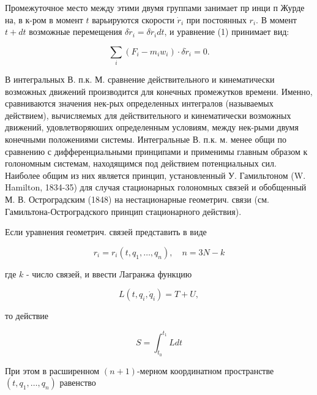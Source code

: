 \documentclass[10pt]{article}
\begin{document}
Промежуточное место между этими двумя группами занимает пр инци п Журде на, в к-ром в момент $t$ варьируются скорости $\dot{r}_{i}$ при постоянных $r_{i}$. В момент $t+d t$ возможные перемещения $\delta \dot{r}_{i}=\delta \ddot{r}_{i} d t$, и уравнение (1) принимает вид:



\[

\sum_{i}\left(F_{i}-m_{i} w_{i}\right) \cdot \delta \dot{r}_{i}=0 .

\]



В интегральных В. п.к. М. сравнение действительного и кинематически возможных движений производится для конечных промежутков времени. Именно, сравниваются значения нек-рых определенных интегралов (называемых действием), вычисляемых для действительного и кинематически возможных движений, удовлетворяюших определенным условиям, между нек-рыми двумя конечными положениями системы. Интегральные В. п.к. м. менее общи по сравнению с дифференциальными принципами и применимы главным образом к голономным системам, находящимся под действием потенциальных сил. Наиболее общим из них является принцип, установленный У. Гамильтоном (W. Hamilton, 1834-35) для случая стационарных голономных связей и обобщенный М. В. Остроградским (1848) на нестационарные геометрич. связи (см. Гамильтона-Остроградского принцип стационарного действия).



Если уравнения геометрич. связей представить в виде



\[

r_{i}=r_{i}\left(t, q_{1}, \ldots, q_{n}\right), \quad n=3 N-k

\]



где $k$ - число связей, и ввести Лагранжа функцию



\[

L\left(t, q_{i}, \dot{q}_{i}\right)=T+U,

\]



то действие



\[

S=\int_{t_{0}}^{t_{1}} L d t

\]



При этом в расширенном $(n+1)$-мерном координатном пространстве $\left(t, q_{1}, \ldots, q_{n}\right)$ равенство
\end{document}
